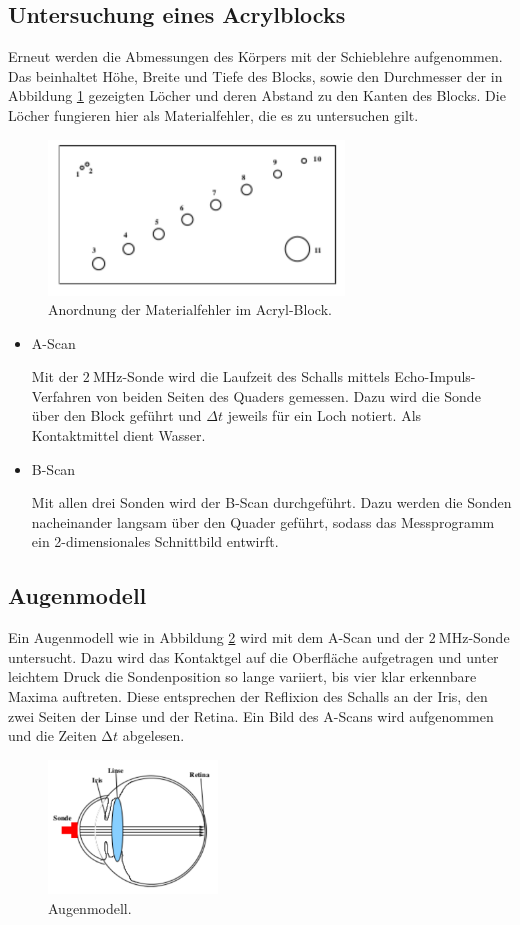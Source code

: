 \subsection{Untersuchung eines Acrylblocks}
Erneut werden die Abmessungen des Körpers mit der Schieblehre aufgenommen. Das beinhaltet Höhe, Breite und Tiefe des Blocks, sowie den Durchmesser der in Abbildung \ref{fig:block} gezeigten Löcher und deren Abstand zu den Kanten des Blocks. Die Löcher fungieren hier als Materialfehler, die es zu untersuchen gilt.
\begin{figure}
	\centering
	\includegraphics[width=0.7\textwidth]{Bilder/Block.pdf}
	\caption{Anordnung der Materialfehler im Acryl-Block. \cite{skript}} 
\label{fig:block}
\end{figure}
\begin{itemize}
\item{A-Scan}

Mit der $\SI{2}{\mega\hertz}$-Sonde wird die Laufzeit des Schalls mittels Echo-Impuls-Verfahren von beiden Seiten des Quaders gemessen. Dazu wird die Sonde über den Block geführt und $\Delta{t}$ jeweils für ein Loch notiert. Als Kontaktmittel dient Wasser.
\item{B-Scan}

Mit allen drei Sonden wird der B-Scan durchgeführt. Dazu werden die Sonden nacheinander langsam über den Quader geführt, sodass das Messprogramm ein 2-dimensionales Schnittbild entwirft.
\end{itemize}
\subsection{Augenmodell}
Ein Augenmodell wie in Abbildung \ref{fig:auge} wird mit dem A-Scan und der $\SI{2}{\mega\hertz}$-Sonde untersucht. Dazu wird das Kontaktgel auf die Oberfläche aufgetragen und unter leichtem Druck die Sondenposition so lange variiert, bis vier klar erkennbare Maxima auftreten. Diese entsprechen der Reflixion des Schalls an der Iris, den zwei Seiten der Linse und der Retina. Ein Bild des A-Scans wird aufgenommen und die Zeiten $\mathup\Delta{t}$ abgelesen.
\begin{figure}
	\centering
	\includegraphics[width=0.4\textwidth]{Bilder/Auge.pdf}
	\caption{Augenmodell.}%
\label{fig:auge}
\end{figure}

